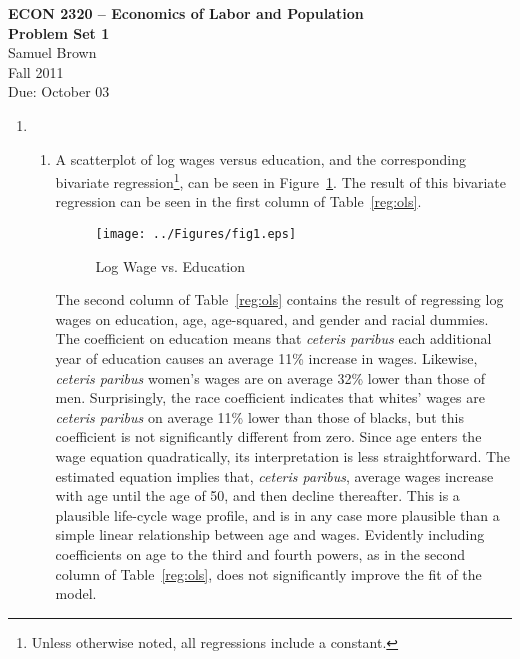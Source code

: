 \documentclass{article}
\begin{document}
\begin{center}
\textbf{ECON 2320 -- Economics of Labor and Population} \\
\textbf{Problem Set 1} \\
Samuel Brown \\
Fall 2011 \\
Due: October 03

\end{center}
\bigskip

\arraycolsep 1pt

\begin{enumerate}
\item \begin{enumerate}

\renewcommand{\thefootnote}{\fnsymbol{footnote}}
\item A scatterplot of log wages versus education, and the corresponding bivariate regression\footnote{Unless otherwise noted, all regressions include a constant.}, can be seen in Figure~\ref{fig:lw_ed_reg}. The result of this bivariate regression can be seen in the first column of Table~\ref{reg:ols}.

\begin{figure}[htbp!]
\centering
\texttt{[image: ../Figures/fig1.eps]}
\caption{Log Wage vs. Education}
\label{fig:lw_ed_reg}
\end{figure}

The second column of Table~\ref{reg:ols} contains the result of regressing log wages on education, age, age-squared, and gender and racial dummies. The coefficient on education means that \textit{ceteris paribus} each additional year of education causes an average 11\% increase in wages. Likewise, \textit{ceteris paribus} women's wages are on average 32\% lower than those of men. Surprisingly, the race coefficient indicates that whites' wages are \textit{ceteris paribus} on average 11\% lower than those of blacks, but this coefficient is not significantly different from zero. Since age enters the wage equation quadratically, its interpretation is less straightforward. The estimated equation implies that, \textit{ceteris paribus}, average wages increase with age until the age of 50, and then decline thereafter. This is a plausible life-cycle wage profile, and is in any case more plausible than a simple linear relationship between age and wages. Evidently including coefficients on age to the third and fourth powers, as in the second column of Table~\ref{reg:ols}, does not significantly improve the fit of the model.


\end{enumerate}
\end{enumerate}
\end{document}
